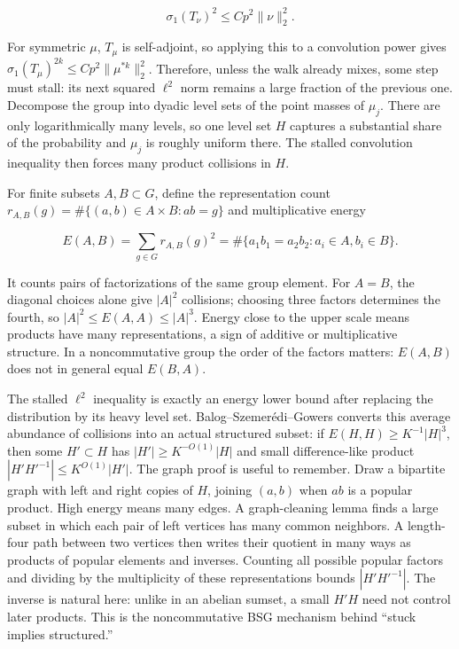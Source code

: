 \[ \sigma_1(T_\nu)^2\leq C p^2\|\nu\|_2^2. \]

For symmetric \(\mu\), \(T_\mu\) is self-adjoint, so applying this to a convolution power gives \(\sigma_1(T_\mu)^{2k}\leq C p^2\|\mu^{*k}\|_2^2\). Therefore, unless the walk already mixes, some step must stall: its next squared \(\ell^2\) norm remains a large fraction of the previous one. Decompose the group into dyadic level sets of the point masses of \(\mu_j\). There are only logarithmically many levels, so one level set \(H\) captures a substantial share of the probability and \(\mu_j\) is roughly uniform there. The stalled convolution inequality then forces many product collisions in \(H\).

For finite subsets \(A,B\subset G\), define the representation count \(r_{A,B}(g)=\#\{(a,b)\in A\times B:ab=g\}\) and multiplicative energy

\[ E(A,B)=\sum_{g\in G}r_{A,B}(g)^2=\#\{a_1b_1=a_2b_2:a_i\in A,b_i\in B\}. \]

It counts pairs of factorizations of the same group element. For \(A=B\), the diagonal choices alone give \(|A|^2\) collisions; choosing three factors determines the fourth, so \(|A|^2\leq E(A,A)\leq|A|^3\). Energy close to the upper scale means products have many representations, a sign of additive or multiplicative structure. In a noncommutative group the order of the factors matters: \(E(A,B)\) does not in general equal \(E(B,A)\).

The stalled \(\ell^2\) inequality is exactly an energy lower bound after replacing the distribution by its heavy level set. Balog--Szemerédi--Gowers converts this average abundance of collisions into an actual structured subset: if \(E(H,H)\geq K^{-1}|H|^3\), then some \(H'\subset H\) has \(|H'|\geq K^{-O(1)}|H|\) and small difference-like product \(|H'H'^{-1}|\leq K^{O(1)}|H'|\). The graph proof is useful to remember. Draw a bipartite graph with left and right copies of \(H\), joining \((a,b)\) when \(ab\) is a popular product. High energy means many edges. A graph-cleaning lemma finds a large subset in which each pair of left vertices has many common neighbors. A length-four path between two vertices then writes their quotient in many ways as products of popular elements and inverses. Counting all possible popular factors and dividing by the multiplicity of these representations bounds \(|H'H'^{-1}|\). The inverse is natural here: unlike in an abelian sumset, a small \(H'H\) need not control later products. This is the noncommutative BSG mechanism behind ``stuck implies structured.''

